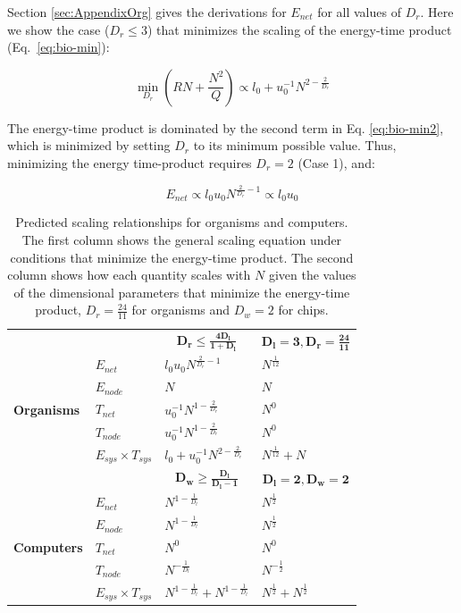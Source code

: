 \documentclass[12pt]{article}
\newcommand\T{\rule{0pt}{3ex}}       %
\newcommand\B{\rule[-1.2ex]{0pt}{0pt}} %
\begin{document}
Section \ref{sec:AppendixOrg} gives the derivations for $E_{net}$
for all values of $D_r$. Here we show the case ($D_r \leq 3$) that minimizes
the scaling of the energy-time product (Eq.~\ref{eq:bio-min}):

\begin{equation}
  \min_{D_r} (RN + \frac{N^2}{Q})
  \propto l_0 + u_0^{-1}N^{2-\frac{2}{D_r}}
\label{eq:bio-min2}
\end{equation}


The energy-time product is dominated by the second term in Eq.
\ref{eq:bio-min2}, which is minimized by setting $D_r$ to its minimum possible
value. Thus, minimizing the energy time-product requires $D_r = 2$
(Case 1), and:

\begin{equation}
E_{net} \propto l_0 u_0 N^{\frac{2}{D_r}-1} \propto l_0 u_0
\label{eq:EnetOrg}
\end{equation}


\begin{table}
\centering
\begin{tabular}{l|l||l|l|}
\multicolumn{2}{l}{} & \multicolumn{1}{c}{$\mathbf{D_r \leq
\frac{4D_l}{1+D_l}}$} & \multicolumn{1}{c}{$\mathbf{D_l=3, D_r=\frac{24}{11}}$}
  \T \B \\
  \cline{2-4}
\multirow{5}{*}{\textbf{Organisms}} & $E_{net}$ &$l_0u_0 N^{\frac{2}{D_r}-1}$ &
  $N^{\frac{1}{12}}$ \T \\
\cline{2-4}
& $E_{node}$ &  $N$ & $N$ \T \\
\cline{2-4}
& $T_{net}$ & $u_0^{-1}N^{1-\frac{2}{D_r}}$ & $N^0$ \T \\
\cline{2-4}
& $T_{node}$ & $u_0^{-1}N^{1-\frac{2}{D_r}}$ & $N^0$ \T \\  

\cline{2-4}
& $E_{sys} \times T_{sys}$ & $l_0 + u_0^{-1}N^{2-\frac{2}{D_r}}$ &
$N^{\frac{1}{12}} + N$ \T \\
\cline{2-4}
\multicolumn{2}{c}{}  & \multicolumn{1}{c}{$\mathbf{D_w \geq
\frac{D_l}{D_l-1}}$} & \multicolumn{1}{c}{$\mathbf{D_l=2,D_w =2}$} \T \B \\
\cline{2-4}
\multirow{5}{*}{\textbf{Computers}} & $E_{net}$ & $N^{1-\frac{1}{D_l}}$&
$N^{\frac{1}{2}}$ \T \\
\cline{2-4}
& $E_{node}$&$N^{1-\frac{1}{D_l}}$ &$N^{\frac{1}{2}}$ \T \\
\cline{2-4}
& $T_{net}$ & $N^{0}$& $N^{0}$ \T \\
\cline{2-4}
& $T_{node}$& $N^{-\frac{1}{D_l}}$& $N^{-\frac{1}{2}}$ \T \\
\cline{2-4}
& $E_{sys} \times T_{sys}$ &$N^{1-\frac{1}{D_l}} + N^{1-\frac{1}{D_l}}$
&$N^{\frac{1}{2}} + N^{\frac{1}{2}}$ \T \\
\cline{2-4}
\end{tabular}
\caption{Predicted scaling relationships for organisms and computers. The first column shows the general scaling equation under conditions that minimize the energy-time product. The second column shows how each quantity scales with $N$ given the values of the dimensional parameters that minimize the energy-time product, $D_r = \frac{24}{11}$ for organisms and $D_w = 2$ for chips. 
\label{tab:SummaryScalingPredictions}}
\end{table}
\end{document}
